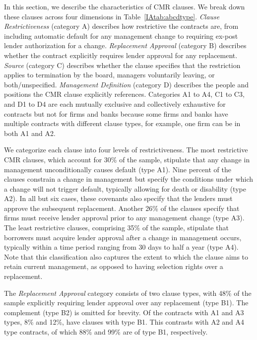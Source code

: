 \documentclass[12pt]{article}
\begin{document}
\begin{appendices}
In this section, we describe the characteristics of CMR clauses.
We break down these clauses across four dimensions in Table~\ref{IAtab:abcdtype}.
\textit{Clause Restrictiveness} (category A) describes how restrictive the contracts are, from including automatic default for any management change to requiring ex-post lender authorization for a change.
\textit{Replacement Approval} (category B) describes whether the contract explicitly requires lender approval for any replacement.
\textit{Source} (category C) describes whether the clause specifies that the restriction applies to termination by the board, managers voluntarily leaving, or both/unspecified.
\textit{Management Definition} (category D) describes the people and positions the CMR clause explicitly references.
Categories A1 to A4, C1 to C3, and D1 to D4 are each mutually exclusive and collectively exhaustive for contracts but not for firms and banks because some firms and banks have multiple contracts with different clause types, for example, one firm can be in both A1 and A2.


We categorize each clause into four levels of restrictiveness.
The most restrictive CMR clauses, which account for 30\% of the sample, stipulate that any change in management unconditionally causes default (type A1).
Nine percent of the clauses constrain a change in management but specify the conditions under which a change will not trigger default, typically allowing for death or disability (type A2).
In all but six cases, these covenants also specify that the lenders must approve the subsequent replacement.
Another 26\% of the clauses specify that firms must receive lender approval prior to any management change (type A3).
The least restrictive clauses, comprising 35\% of the sample, stipulate that borrowers must acquire lender approval after a change in management occurs, typically within a time period ranging from 30 days to half a year (type A4).
Note that this classification also captures the extent to which the clause aims to retain current management, as opposed to having selection rights over a replacement.


The \textit{Replacement Approval} category consists of two clause types, with 48\% of the sample explicitly requiring lender approval over any replacement (type B1).
The complement (type B2) is omitted for brevity.
Of the contracts with A1 and A3 types, 8\% and 12\%, have clauses with type B1.
This contrasts with A2 and A4 type contracts, of which 88\% and 99\% are of type B1, respectively.


\end{appendices}
\end{document}
